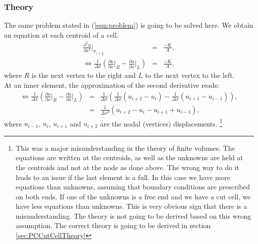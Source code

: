 \documentclass[a4paper,12pt]{article}
\begin{document}
\subsubsection{Theory}
The same problem stated in (\ref{eqn:problem}) is going to be solved here. We obtain an equation at each centroid of a cell.
\begin{eqnarray}
\frac{\partial ^2 u}{\partial x^2}\vert_{x_{i+\frac{1}{2}}}  &=& \frac{-K}{A},\\
\Leftrightarrow \frac{1}{\Delta x}(\frac{\partial u}{\partial x}\vert_{R} -\frac{\partial u}{\partial x}\vert_{L}) &=& \frac{-K}{A},
\end{eqnarray}
where $R$ is the next vertex to the right and $L$ to the next vertex to the left.\\
At an inner element, the approximation of the second derivative reads:
\begin{eqnarray}
\Leftrightarrow \frac{1}{\Delta x}(\frac{\partial u}{\partial x}\vert_{R} -\frac{\partial u}{\partial x}\vert_{L}) &=& \frac{1}{\Delta x}(\frac{1}{\Delta x}(u_{i+2}-u_{i}) - \frac{1}{\Delta x}(u_{i+1}-u_{i-1})),\\
&=& \frac{1}{\Delta x^2}(u_{i+2}-u_{i}-u_{i+1}+u_{i-1}),
\end{eqnarray}
where $u_{i-1}$, $u_{i}$, $u_{i+1}$ and $u_{i+2}$ are the nodal (vertices) displacements. \footnote{This was a major misunderstanding in the theory of finite volumes. The equations are written at the centroids, as well as the unknowns are held at the centroids and not at the node as done above. The wrong way to do it leads to an issue if the last element is a full. In this case we have more equations than unknowns, assuming that boundary conditions are prescribed on both ends. If one of the unknowns is  a free end and we have a cut cell, we have less equations than unknowns. This is very obvious sign that there is a misunderstanding. The theory is not going to be derived based on this wrong assumption. The correct theory is going to be derived in section \ref{sec:PCCutCellTheory} }
\end{document}
